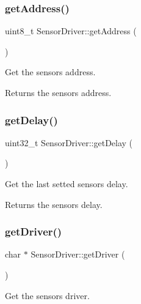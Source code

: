 \subsubsection{\texorpdfstring{get\+Address()}{getAddress()}}
{\footnotesize\ttfamily uint8\+\_\+t Sensor\+Driver\+::get\+Address (\begin{DoxyParamCaption}{ }\end{DoxyParamCaption})}



Get the sensor\textquotesingle{}s address. 

\begin{DoxyReturn}{Returns}
the sensor\textquotesingle{}s address. 
\end{DoxyReturn}
\mbox{\label{classSensorDriver_a432c4878ec9ca5145a4bdd827ebbc7d7}} 
\subsubsection{\texorpdfstring{get\+Delay()}{getDelay()}}
{\footnotesize\ttfamily uint32\+\_\+t Sensor\+Driver\+::get\+Delay (\begin{DoxyParamCaption}{ }\end{DoxyParamCaption})}



Get the last setted sensor\textquotesingle{}s delay. 

\begin{DoxyReturn}{Returns}
the sensor\textquotesingle{}s delay. 
\end{DoxyReturn}
\mbox{\label{classSensorDriver_a5056f9f058d069b9840a6045c1a652d3}} 
\subsubsection{\texorpdfstring{get\+Driver()}{getDriver()}}
{\footnotesize\ttfamily char $\ast$ Sensor\+Driver\+::get\+Driver (\begin{DoxyParamCaption}{ }\end{DoxyParamCaption})}



Get the sensor\textquotesingle{}s driver. 


